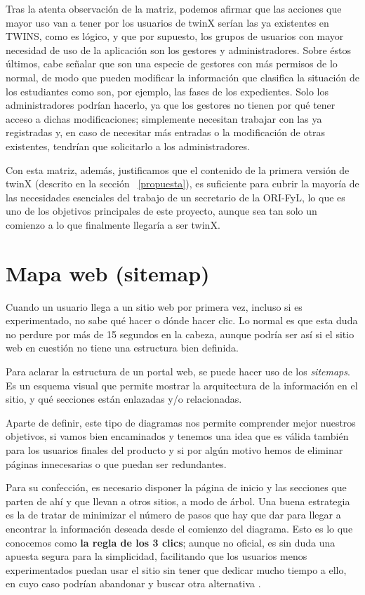 Tras la atenta observación de la matriz, podemos afirmar que las acciones que mayor uso van a tener por los usuarios de twinX serían las ya existentes en TWINS, como es lógico, y que por supuesto, los grupos de usuarios con mayor necesidad de uso de la aplicación son los gestores y administradores. Sobre éstos últimos, cabe señalar que son una especie de gestores con más permisos de lo normal, de modo que pueden modificar la información que clasifica la situación de los estudiantes como son, por ejemplo, las fases de los expedientes. Solo los administradores podrían hacerlo, ya que los gestores no tienen por qué tener acceso a dichas modificaciones; simplemente necesitan trabajar con las ya registradas y, en caso de necesitar más entradas o la modificación de otras existentes, tendrían que solicitarlo a los administradores.

Con esta matriz, además, justificamos que el contenido de la primera versión de twinX (descrito en la sección ~\ref{propuesta}), es suficiente para cubrir la mayoría de las necesidades esenciales del trabajo de un secretario de la ORI-FyL, lo que es uno de los objetivos principales de este proyecto, aunque sea tan solo un comienzo a lo que finalmente llegaría a ser twinX.

\section{Mapa web (sitemap)}

Cuando un usuario llega a un sitio web por primera vez, incluso si es experimentado, no sabe qué hacer o dónde hacer clic. Lo normal es que esta duda no perdure por más de 15 segundos en la cabeza, aunque podría ser así si el sitio web en cuestión no tiene una estructura bien definida.

Para aclarar la estructura de un portal web, se puede hacer uso de los \textit{sitemaps}. Es un esquema visual que permite mostrar la arquitectura de la información en el sitio, y qué secciones están enlazadas y/o relacionadas.

Aparte de definir, este tipo de diagramas nos permite comprender mejor nuestros objetivos, si vamos bien encaminados y tenemos una idea que es válida también para los usuarios finales del producto y si por algún motivo hemos de eliminar páginas innecesarias o que puedan ser redundantes.

Para su confección, es necesario disponer la página de inicio y las secciones que parten de ahí y que llevan a otros sitios, a modo de árbol. Una buena estrategia es la de tratar de minimizar el número de pasos que hay que dar para llegar a encontrar la información deseada desde el comienzo del diagrama. Esto es lo que conocemos como \textbf{la regla de los 3 clics}; aunque no oficial, es sin duda una apuesta segura para la simplicidad, facilitando que los usuarios menos experimentados puedan usar el sitio sin tener que dedicar mucho tiempo a ello, en cuyo caso podrían abandonar y buscar otra alternativa \cite{sitemap}.

